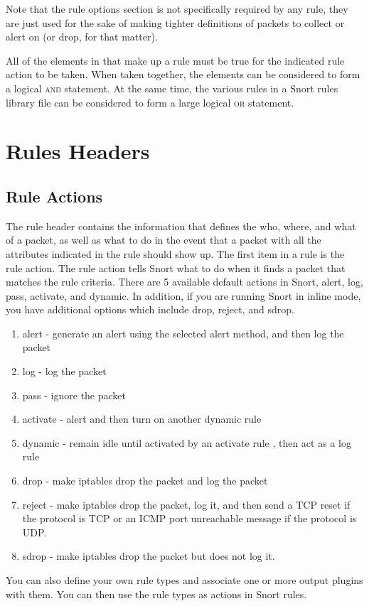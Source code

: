 \documentclass[english]{report}
\newenvironment{note}{
\samepage
    \vspace{10pt}{\textsf{
        {\hspace{7pt}\Huge{$\triangle$\hspace{-12.5pt}{\Large{$^!$}}}}\hspace{5pt}
        {\Large{NOTE}}
    }
    }
   \begin{center}
    \par\vspace{-17pt}

    \begin{lrbox}{\savepar}
    \begin{minipage}[r]{6in}
}
{
    \end{minipage}
    \end{lrbox}
    \fbox{
        \usebox{
            \savepar
	}
    }
    \par\vskip10pt
    \end{center}
}
\newenvironment{note}{
        \begin{rawhtml}
        <p><table border="1"><tr><td><b>
        Note:&nbsp;&nbsp;</b>
        \end{rawhtml}
}{
        \begin{rawhtml}
        </b></td></tr></table></p>
        \end{rawhtml}
}
\begin{document}
\begin{note}
Note that the rule options section is not specifically required by any
rule, they are just used for the sake of making tighter definitions
of packets to collect or alert on (or drop, for that matter). 
\end{note}

All of the elements in that make up a rule must be true for the indicated
rule action to be taken. When taken together, the elements can be
considered to form a logical \textsc{and} statement. At the same time,
the various rules in a Snort rules library file can be considered
to form a large logical \textsc{or} statement. 


\section{Rules Headers}


\subsection{Rule Actions \label{rules action section}}

The rule header contains the information that defines the who,
where, and what of a packet, as well as what to do in the
event that a packet with all the attributes indicated in the rule
should show up. The first item in a rule is the rule action. The rule
action tells Snort what to do when it finds a packet that matches
the rule criteria. There are 5 available default actions in Snort,
alert, log, pass, activate, and dynamic. In addition, if you are running
Snort in inline mode, you have additional options which include drop, reject, and sdrop. 

\begin{enumerate}
\item alert - generate an alert using the selected alert method, and then
log the packet 
\item log - log the packet 
\item pass - ignore the packet 
\item activate - alert and then turn on another dynamic rule  
\item dynamic - remain idle until activated by an activate rule , then act
as a log rule
\item drop - make iptables drop the packet and log the packet
\item reject - make iptables drop the packet, log it, and then send a 
TCP reset if the protocol is TCP or an ICMP port unreachable message if the 
protocol is UDP.
\item sdrop - make iptables drop the packet but does not log it.
\end{enumerate}
You can also define your own rule types and associate one or more
output plugins with them. You can then use the rule types as actions
in Snort rules.
\end{document}
